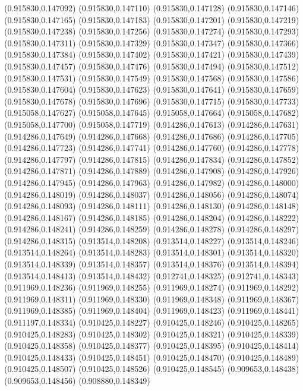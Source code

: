 (0.915830,0.147092)
(0.915830,0.147110)
(0.915830,0.147128)
(0.915830,0.147146)
(0.915830,0.147165)
(0.915830,0.147183)
(0.915830,0.147201)
(0.915830,0.147219)
(0.915830,0.147238)
(0.915830,0.147256)
(0.915830,0.147274)
(0.915830,0.147293)
(0.915830,0.147311)
(0.915830,0.147329)
(0.915830,0.147347)
(0.915830,0.147366)
(0.915830,0.147384)
(0.915830,0.147402)
(0.915830,0.147421)
(0.915830,0.147439)
(0.915830,0.147457)
(0.915830,0.147476)
(0.915830,0.147494)
(0.915830,0.147512)
(0.915830,0.147531)
(0.915830,0.147549)
(0.915830,0.147568)
(0.915830,0.147586)
(0.915830,0.147604)
(0.915830,0.147623)
(0.915830,0.147641)
(0.915830,0.147659)
(0.915830,0.147678)
(0.915830,0.147696)
(0.915830,0.147715)
(0.915830,0.147733)
(0.915058,0.147627)
(0.915058,0.147645)
(0.915058,0.147664)
(0.915058,0.147682)
(0.915058,0.147700)
(0.915058,0.147719)
(0.914286,0.147613)
(0.914286,0.147631)
(0.914286,0.147649)
(0.914286,0.147668)
(0.914286,0.147686)
(0.914286,0.147705)
(0.914286,0.147723)
(0.914286,0.147741)
(0.914286,0.147760)
(0.914286,0.147778)
(0.914286,0.147797)
(0.914286,0.147815)
(0.914286,0.147834)
(0.914286,0.147852)
(0.914286,0.147871)
(0.914286,0.147889)
(0.914286,0.147908)
(0.914286,0.147926)
(0.914286,0.147945)
(0.914286,0.147963)
(0.914286,0.147982)
(0.914286,0.148000)
(0.914286,0.148019)
(0.914286,0.148037)
(0.914286,0.148056)
(0.914286,0.148074)
(0.914286,0.148093)
(0.914286,0.148111)
(0.914286,0.148130)
(0.914286,0.148148)
(0.914286,0.148167)
(0.914286,0.148185)
(0.914286,0.148204)
(0.914286,0.148222)
(0.914286,0.148241)
(0.914286,0.148259)
(0.914286,0.148278)
(0.914286,0.148297)
(0.914286,0.148315)
(0.913514,0.148208)
(0.913514,0.148227)
(0.913514,0.148246)
(0.913514,0.148264)
(0.913514,0.148283)
(0.913514,0.148301)
(0.913514,0.148320)
(0.913514,0.148339)
(0.913514,0.148357)
(0.913514,0.148376)
(0.913514,0.148394)
(0.913514,0.148413)
(0.913514,0.148432)
(0.912741,0.148325)
(0.912741,0.148343)
(0.911969,0.148236)
(0.911969,0.148255)
(0.911969,0.148274)
(0.911969,0.148292)
(0.911969,0.148311)
(0.911969,0.148330)
(0.911969,0.148348)
(0.911969,0.148367)
(0.911969,0.148385)
(0.911969,0.148404)
(0.911969,0.148423)
(0.911969,0.148441)
(0.911197,0.148334)
(0.910425,0.148227)
(0.910425,0.148246)
(0.910425,0.148265)
(0.910425,0.148283)
(0.910425,0.148302)
(0.910425,0.148321)
(0.910425,0.148339)
(0.910425,0.148358)
(0.910425,0.148377)
(0.910425,0.148395)
(0.910425,0.148414)
(0.910425,0.148433)
(0.910425,0.148451)
(0.910425,0.148470)
(0.910425,0.148489)
(0.910425,0.148507)
(0.910425,0.148526)
(0.910425,0.148545)
(0.909653,0.148438)
(0.909653,0.148456)
(0.908880,0.148349)
